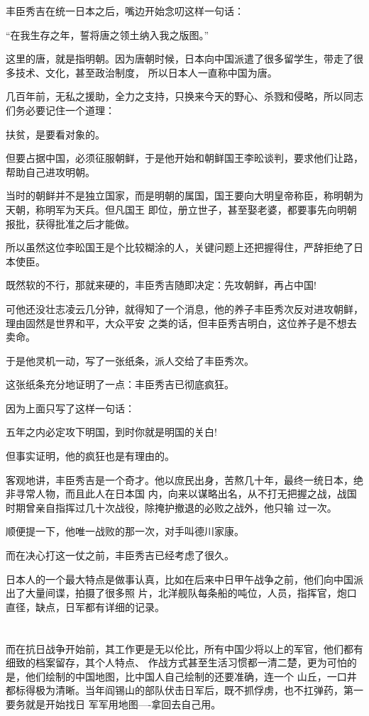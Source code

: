 \documentclass[11pt,a4paper,onecolumn]{article}
\begin{document}
丰臣秀吉在统一日本之后，嘴边开始念叨这样一句话：

``在我生存之年，誓将唐之领土纳入我之版图。''

这里的唐，就是指明朝。因为唐朝时候，日本向中国派遣了很多留学生，带走了很多技术、文化，甚至政治制度，
所以日本人一直称中国为唐。

几百年前，无私之援助，全力之支持，只换来今天的野心、杀戮和侵略，所以同志们务必要记住一个道理：

扶贫，是要看对象的。

但要占据中国，必须征服朝鲜，于是他开始和朝鲜国王李昖谈判，要求他们让路，帮助自己进攻明朝。

当时的朝鲜并不是独立国家，而是明朝的属国，国王要向大明皇帝称臣，称明朝为天朝，称明军为天兵。但凡国王
即位，册立世子，甚至娶老婆，都要事先向明朝报批，获得批准之后才能做。

所以虽然这位李昖国王是个比较糊涂的人，关键问题上还把握得住，严辞拒绝了日本使臣。

既然软的不行，那就来硬的，丰臣秀吉随即决定：先攻朝鲜，再占中国!

可他还没壮志凌云几分钟，就得知了一个消息，他的养子丰臣秀次反对进攻朝鲜，理由固然是世界和平，大众平安
之类的话，但丰臣秀吉明白，这位养子是不想去卖命。

于是他灵机一动，写了一张纸条，派人交给了丰臣秀次。

这张纸条充分地证明了一点：丰臣秀吉已彻底疯狂。

因为上面只写了这样一句话：

五年之内必定攻下明国，到时你就是明国的关白!

但事实证明，他的疯狂也是有理由的。

客观地讲，丰臣秀吉是一个奇才。他以庶民出身，苦熬几十年，最终一统日本，绝非寻常人物，而且此人在日本国
内，向来以谋略出名，从不打无把握之战，战国时期曾亲自指挥过几十次战役，除掩护撤退的必败之战外，他只输
过一次。

顺便提一下，他唯一战败的那一次，对手叫德川家康。

而在决心打这一仗之前，丰臣秀吉已经考虑了很久。

日本人的一个最大特点是做事认真，比如在后来中日甲午战争之前，他们向中国派出了大量间谍，拍摄了很多照
片，北洋舰队每条船的吨位，人员，指挥官，炮口直径，缺点，日军都有详细的记录。

\section[\thesection]{}

而在抗日战争开始前，其工作更是无以伦比，所有中国少将以上的军官，他们都有细致的档案留存，其个人特点、
作战方式甚至生活习惯都一清二楚，更为可怕的是，他们绘制的中国地图，比中国人自己绘制的还要准确，连一个
山丘，一口井都标得极为清晰。当年阎锡山的部队伏击日军后，既不抓俘虏，也不扛弹药，第一要务就是开始找日
军军用地图----拿回去自己用。
\end{document}
